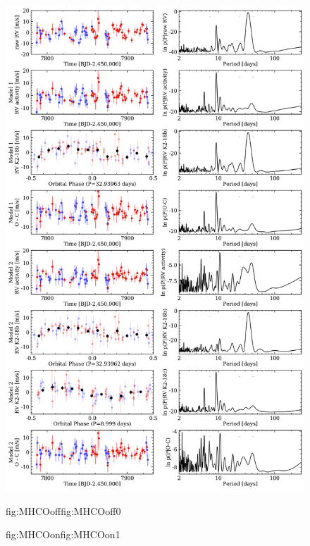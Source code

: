 \begin{figure} %
  \centering
  \includegraphics[width=0.8\hsize]{figures/analysisHCoverlap_bkgd.png}%
  \hspace{-0.8\hsize}%
  \begin{ocg}{fig:MHCOoff}{fig:MHCOoff}{0}%
  \end{ocg}%
  \begin{ocg}{fig:MHCOon}{fig:MHCOon}{1}%

\end{ocg}
\end{figure}
